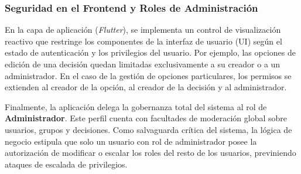 \subsubsection{Seguridad en el Frontend y Roles de Administración}
En la capa de aplicación (\textit{Flutter}), se implementa un control de visualización reactivo que restringe los componentes de la interfaz de usuario (UI) según el estado de autenticación y los privilegios del usuario. Por ejemplo, las opciones de edición de una decisión quedan limitadas exclusivamente a su creador o a un administrador. En el caso de la gestión de opciones particulares, los permisos se extienden al creador de la opción, al creador de la decisión y al administrador.

Finalmente, la aplicación delega la gobernanza total del sistema al rol de \textbf{Administrador}. Este perfil cuenta con facultades de moderación global sobre usuarios, grupos y decisiones. Como salvaguarda crítica del sistema, la lógica de negocio estipula que solo un usuario con rol de administrador posee la autorización de modificar o escalar los roles del resto de los usuarios, previniendo ataques de escalada de privilegios.